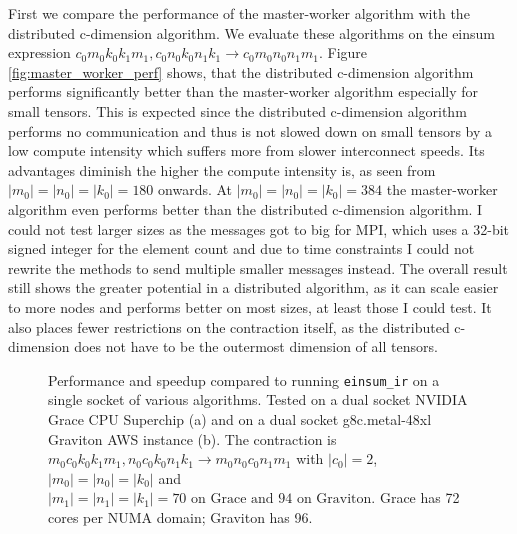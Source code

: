 First we compare the performance of the master-worker algorithm with the distributed c-dimension algorithm.
We evaluate these algorithms on the einsum expression $c_0m_0k_0k_1m_1, c_0n_0k_0n_1k_1 \rightarrow c_0m_0n_0n_1m_1$.
Figure \ref{fig:master_worker_perf} shows, that the distributed c-dimension algorithm performs significantly better than the master-worker algorithm especially for small tensors.
This is expected since the distributed c-dimension algorithm performs no communication and thus is not slowed down on small tensors by a low compute intensity which suffers more from slower interconnect speeds.
Its advantages diminish the higher the compute intensity is, as seen from $|m_0|=|n_0|=|k_0|= 180$ onwards.
At $|m_0|=|n_0|=|k_0|= 384$ the master-worker algorithm even performs better than the distributed c-dimension algorithm.
I could not test larger sizes as the messages got to big for MPI, which uses a 32-bit signed integer for the element count and due to time constraints I could not rewrite the methods to send multiple smaller messages instead.
The overall result still shows the greater potential in a distributed algorithm, as it can scale easier to more nodes and performs better on most sizes, at least those I could test.
It also places fewer restrictions on the contraction itself, as the distributed c-dimension does not have to be the outermost dimension of all tensors.

\begin{figure}[ht]
  \centering
    \begin{subfigure}[t]{1\textwidth}
      
    \end{subfigure}
  \caption{
    Performance and speedup compared to running \texttt{einsum\_ir} on a single socket of various algorithms.
    Tested on a dual socket NVIDIA Grace CPU Superchip (a) and on a dual socket g8c.metal-48xl Graviton AWS instance (b).
    The contraction is $m_0c_0k_0k_1m_1, n_0c_0k_0n_1k_1 \rightarrow m_0n_0c_0n_1m_1$ with $|c_0|=2$, $|m_0|=|n_0|=|k_0|$ and $|m_1|=|n_1|=|k_1|=70\text{ on Grace and } 94\text{ on Graviton}$.
    Grace has 72 cores per NUMA domain; Graviton has 96.
    }
  \label{fig:einsum_ir_perf}
\end{figure}

